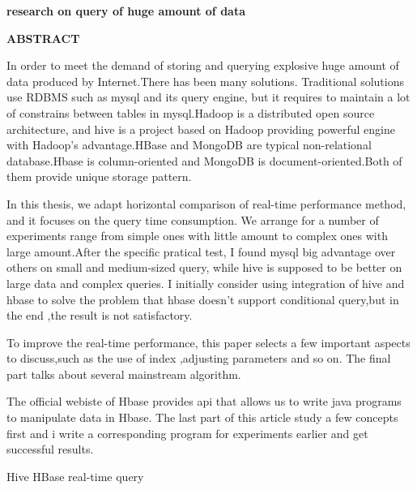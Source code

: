 \begin{center}
\textbf{research on query of huge amount of data}
\end{center}
\begin{center}
\textbf{ABSTRACT}
\end{center}
\vspace{2mm}


In order to meet the demand of storing and querying explosive huge amount of data produced by Internet.There has been many solutions. Traditional solutions use RDBMS such as mysql and its query engine, but it requires to maintain a lot of constrains between tables in mysql.Hadoop is a distributed open source architecture, and hive is a project based on Hadoop providing powerful engine with Hadoop's advantage.HBase and MongoDB are typical non-relational database.Hbase is column-oriented and MongoDB is document-oriented.Both of them provide unique storage pattern.

In this thesis, we adapt horizontal comparison of real-time performance method, and it focuses on the query time consumption. We arrange for a number of experiments range from simple ones with little amount to complex ones with large amount.After the specific pratical test, I found  mysql big advantage over others on small and medium-sized query, while hive is supposed to be better on large data and complex queries. I initially consider using integration of hive and hbase to solve the problem that hbase doesn't support conditional query,but in the end ,the result is not satisfactory.

To improve the real-time performance, this paper selects a few important aspects to discuss,such as the use of index ,adjusting parameters and so on. The final part talks about several mainstream algorithm.

The official webiste of Hbase provides api that allows us to write java programs to manipulate data in Hbase. The last part of this article study a few concepts first and i write a corresponding program for experiments earlier and get successful results.

\vspace{3mm}
\quad Hive \quad HBase \quad real-time query

